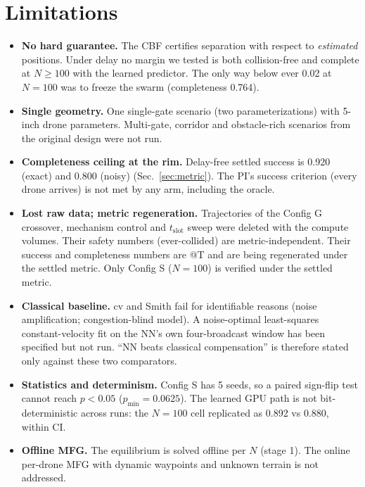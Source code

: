 \documentclass{article}
\newcommand{\tslot}{t_{\mathrm{slot}}}
\begin{document}
\section{Limitations}
\label{sec:limits}
\begin{itemize}
\item \textbf{No hard guarantee.} The CBF certifies separation with respect to \emph{estimated}
  positions. Under delay no margin we tested is both collision-free and complete at $N\ge100$ with
  the learned predictor. The only way below ever 0.02 at $N=100$ was to freeze the swarm
  (completeness 0.764).
\item \textbf{Single geometry.} One single-gate scenario (two parameterizations) with 5-inch drone
  parameters. Multi-gate, corridor and obstacle-rich scenarios from the original design were not run.
\item \textbf{Completeness ceiling at the rim.} Delay-free settled success is 0.920 (exact) and
  0.800 (noisy) (Sec.~\ref{sec:metric}). The PI's success criterion (every drone arrives) is not met
  by any arm, including the oracle.
\item \textbf{Lost raw data; metric regeneration.} Trajectories of the Config G crossover, mechanism
  control and $\tslot$ sweep were deleted with the compute volumes. Their safety numbers
  (ever-collided) are metric-independent. Their success and completeness numbers are @T and are
  being regenerated under the settled metric. Only Config S ($N=100$) is verified under the settled metric.
\item \textbf{Classical baseline.} cv and Smith fail for identifiable reasons (noise
  amplification; congestion-blind model). A noise-optimal least-squares constant-velocity fit on the
  NN's own four-broadcast window has been specified but not run. ``NN beats classical
  compensation'' is therefore stated only against these two comparators.
\item \textbf{Statistics and determinism.} Config S has 5 seeds, so a paired sign-flip test cannot
  reach $p<0.05$ ($p_{\min}=0.0625$). The learned GPU path is not bit-deterministic across runs:
  the $N=100$ cell replicated as 0.892 vs 0.880, within CI.
\item \textbf{Offline MFG.} The equilibrium is solved offline per $N$ (stage 1). The online
  per-drone MFG with dynamic waypoints and unknown terrain is not addressed.
\end{itemize}
\end{document}
